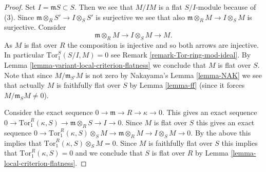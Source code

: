 \documentclass[10pt,a4paper]{amsart}
\theoremstyle{plain}
\theoremstyle{definition}
\theoremstyle{remark}
\numberwithin{equation}{subsection}
\begin{document}
\begin{proof}
Set $I = \mathfrak mS \subset S$. Then we see that $M/IM$ is a flat
$S/I$-module because of (3). Since
$\mathfrak m \otimes_R S' \to I \otimes_S S'$ is surjective we see
that also $\mathfrak m \otimes_R M \to I \otimes_S M$ is surjective.
Consider
$$
\mathfrak m \otimes_R M \to I \otimes_S M \to M.
$$
As $M$ is flat over $R$ the composition is injective
and so both arrows are injective.
In particular $\text{Tor}_1^S(S/I, M) = 0$ see
Remark \ref{remark-Tor-ring-mod-ideal}. By
Lemma \ref{lemma-variant-local-criterion-flatness} we conclude
that $M$ is flat over $S$. Note that since $M/\mathfrak m_{S'}M$
is not zero by Nakayama's Lemma \ref{lemma-NAK}
we see that actually $M$ is faithfully flat over $S$ by
Lemma \ref{lemma-ff} (since it forces $M/\mathfrak m_SM \not = 0$).

\medskip\noindent
Consider the exact sequence
$0 \to \mathfrak m \to R \to \kappa \to 0$.
This gives an exact sequence
$0 \to \text{Tor}_1^R(\kappa, S) \to \mathfrak m \otimes_R S \to I \to 0$.
Since $M$ is flat over $S$ this gives an exact sequence
$0 \to \text{Tor}_1^R(\kappa, S)\otimes_S M \to
\mathfrak m \otimes_R M \to I \otimes_S M \to 0$.
By the above this implies that $\text{Tor}_1^R(\kappa, S)\otimes_S M = 0$.
Since $M$ is faithfully flat over $S$ this implies that
$\text{Tor}_1^R(\kappa, S) = 0$ and we conclude that
$S$ is flat over $R$ by Lemma \ref{lemma-local-criterion-flatness}.
\end{proof}
\end{document}

